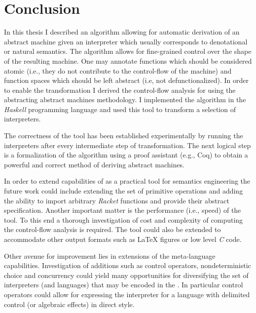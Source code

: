 \chapter{Conclusion}\label{chapter:conclusions}
In this thesis I described an algorithm allowing for automatic derivation of an abstract machine given an interpreter which usually corresponds to denotational or natural semantics.
The algorithm allows for fine-grained control over the shape of the resulting machine.
One may annotate functions which should be considered atomic (i.e., they do not contribute to the control-flow of the machine) and function spaces which should be left abstract (i.e, not defunctionalized).
In order to enable the transformation I derived the control-flow analysis for \IDL{} using the abstracting abstract machines methodology.
I implemented the algorithm in the \textit{Haskell} programming language and used this tool to transform a selection of interpreters.

The correctness of the tool has been established experimentally by running the interpreters after every intermediate step of transformation.
The next logical step is a formalization of the algorithm using a proof assistant (e.g., Coq) to obtain a powerful and correct method of deriving abstract machines.

In order to extend capabilities of \semt{} as a practical tool for semantics engineering the future work could include extending the set of primitive operations and adding the ability to import arbitrary \textit{Racket} functions and provide their abstract specification.
Another important matter is the performance (i.e., speed) of the tool.
To this end a thorough investigation of cost and complexity of computing the control-flow analysis is required.
The tool could also be extended to accommodate other output formats such as \LaTeX{} figures or low level \textit{C} code.

Other avenue for improvement lies in extensions of the meta-language capabilities.
Investigation of additions such as control operators, nondeterministic choice and concurrency could yield many opportunities for diversifying the set of interpreters (and languages) that may be encoded in the \IDL{}.
In particular control operators could allow for expressing the interpreter for a language with delimited control (or algebraic effects) in direct style.